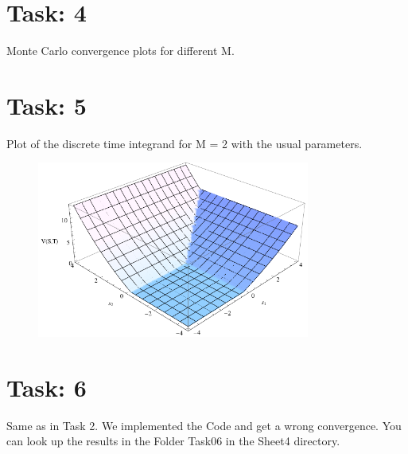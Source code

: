 \documentclass{article}
\begin{document}
\newpage

\section*{Task: 4}
Monte Carlo convergence plots for different M.

\section*{Task: 5}
Plot of the discrete time integrand for M = 2 with the usual parameters.
\begin{figure}[htbp]
  \centering
     \includegraphics[width=0.8\textwidth]{../Task05/task05_plot.pdf}
\end{figure}

\section*{Task: 6}
Same as in Task 2. We implemented the Code and get a wrong convergence. You can look up the results in the Folder Task06 in the Sheet4 directory.
\end{document}
